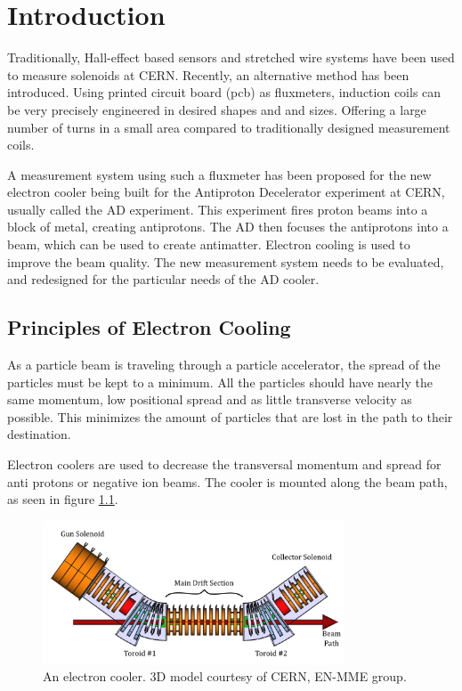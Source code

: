 \chapter{Introduction}
Traditionally, Hall-effect based sensors and stretched wire systems have been
used to measure solenoids at CERN. Recently, an alternative method
has been introduced. Using printed circuit board (pcb) as fluxmeters,
induction coils can be very precisely engineered in desired shapes
and and sizes. Offering a large number of turns in a small area
compared to traditionally designed measurement coils.
\cite{petrone_induction-coil_2022}

A measurement system using such a fluxmeter has been proposed for
the new electron cooler being built for the Antiproton Decelerator
experiment at CERN, usually called the AD experiment. This 
experiment fires proton beams into a block of metal, creating
antiprotons. The AD then focuses the antiprotons into a beam,
which can be used to create antimatter. Electron cooling is
used to improve the beam quality. \cite{noauthor_antiproton_nodate}
The new measurement system needs to be evaluated, and redesigned for the
particular needs of the AD cooler.


\section{Principles of Electron Cooling}
As a particle beam is traveling through a particle accelerator, the spread
of the particles must be kept to a minimum. All the particles should have
nearly the same momentum, low positional spread and as little transverse
velocity as possible. This minimizes the amount of particles that are lost
in the path to their destination.

Electron coolers are used to decrease the transversal momentum and
spread for anti protons
or negative ion beams. The cooler is mounted along the beam path, as seen in
figure \ref{fig:ecooler}.

\begin{figure}[!h]
    \centering
    \includegraphics[width=0.8\textwidth]{figs/ecooler}
    \caption{An electron cooler. 3D model courtesy of CERN, EN-MME group.}
    \label{fig:ecooler}
\end{figure}

